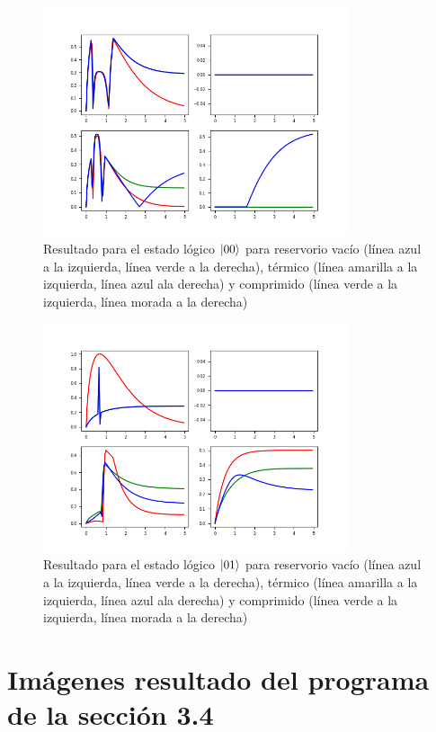 \documentclass{book}
\begin{document}
\begin{figure}[ht]
\centering
\includegraphics[width=0.8\textwidth]{logi00.png}
\caption{Resultado para el estado lógico ${\ket{00}}$ para reservorio vacío (línea azul a la izquierda, línea verde a la derecha), térmico (línea amarilla a la izquierda, línea azul ala derecha) y comprimido (línea verde a la izquierda, línea morada a la derecha)}
\end{figure}

\begin{figure}[ht]
\centering
\includegraphics[width=0.8\textwidth]{logi01.png}
\caption{Resultado para el estado lógico ${\ket{01}}$ para reservorio vacío (línea azul a la izquierda, línea verde a la derecha), térmico (línea amarilla a la izquierda, línea azul ala derecha) y comprimido (línea verde a la izquierda, línea morada a la derecha)}
\end{figure}

\chapter{Imágenes resultado del programa de la sección 3.4}
\end{document}
